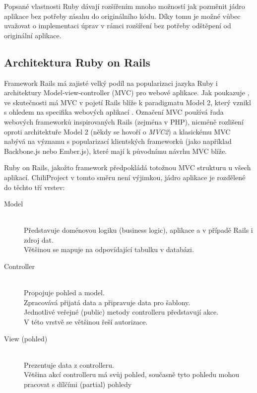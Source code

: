 \documentclass[thesis=B,czech]{FITthesis}[2012/05/02]
\begin{document}
Popsané vlastnosti Ruby dávají rozšířením mnoho možností jak pozměnit jádro
aplikace bez potřeby zásahu do originálního kódu. Díky tomu je možné
vůbec uvažovat o implementaci úprav v rámci rozšíření bez potřeby
odštěpení od originální aplikace.

\subsection{Architektura Ruby on Rails}

Framework Rails má zajisté velký podíl na popularizaci jazyka Ruby i
architektury Model-view-controller (MVC) pro webové aplikace. Jak
poukazuje \citep{Krzywda2011}, ve skutečnosti má MVC v pojetí Rails
blíže k paradigmatu Model 2, který vznikl s ohledem na specifika
webových aplikací \citep{McCallister2004}. Označení MVC používá řada
webových frameworků inspirovaných Rails (zejména v PHP), nicméně
rozlišení oproti architektuře Model 2 (někdy se hovoří o \emph{MVC2}) a
klasickému MVC nabývá na významu s popularizací klientských frameworků
(jako například Backbone.js nebo Ember.js), které mají k původnímu
návrhu MVC blíže.

Ruby on Rails, jakožto  framework \citep[kpt. 4, Make
Opinionated Software]{Fried2009}
předpokládá totožnou MVC strukturu u všech aplikací. ChiliProject
v tomto směru není výjimkou, jádro aplikace je rozdělené do těchto tří vrstev:

\begin{description}
\item[Model] \hfill \\
Představuje doménovou logiku (business logic), aplikace a v případě Rails i zdroj dat. \hfill \\
Většinou se mapuje na odpovídající tabulku v databázi.
\item[Controller] \hfill \\
Propojuje pohled a model. \hfill \\
Zpracovává přijatá data a připravuje data pro šablony. \hfill \\
Jednotlivé veřejné (public) metody controlleru představují akce. \hfill \\
V této vrstvě se většinou řeší autorizace.
\item[View (pohled)] \hfill \\
Prezentuje data z controlleru. \hfill \\
Většina akcí controlleru má svůj pohled, současně tyto pohledu mohou pracovat s dílčími (partial) pohledy
\end{description}
\end{document}
